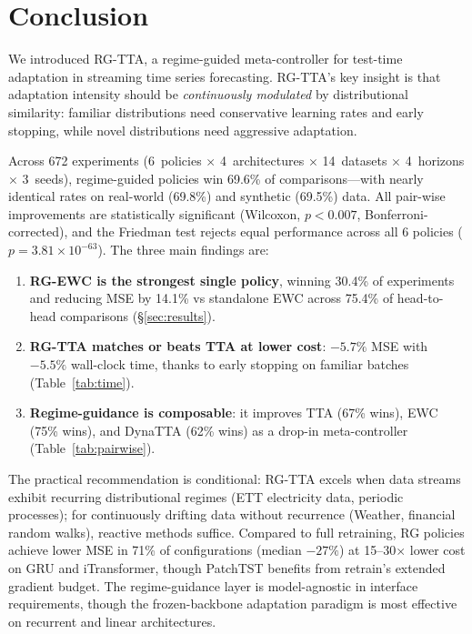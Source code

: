 \documentclass[journal]{IEEEtran}
\begin{document}
\section{Conclusion}
\label{sec:conclusion}

We introduced RG-TTA, a regime-guided meta-controller for test-time adaptation in streaming time series forecasting. RG-TTA's key insight is that adaptation intensity should be \emph{continuously modulated} by distributional similarity: familiar distributions need conservative learning rates and early stopping, while novel distributions need aggressive adaptation.

Across 672 experiments (6~policies $\times$ 4~architectures $\times$ 14~datasets $\times$ 4~horizons $\times$ 3~seeds), regime-guided policies win 69.6\% of comparisons---with nearly identical rates on real-world (69.8\%) and synthetic (69.5\%) data. All pair-wise improvements are statistically significant (Wilcoxon, $p < 0.007$, Bonferroni-corrected), and the Friedman test rejects equal performance across all 6 policies ($p = 3.81 \times 10^{-63}$). The three main findings are:

\begin{enumerate}[nosep]
  \item \textbf{RG-EWC is the strongest single policy}, winning 30.4\% of experiments and reducing MSE by 14.1\% vs standalone EWC across 75.4\% of head-to-head comparisons (\S\ref{sec:results}).
  \item \textbf{RG-TTA matches or beats TTA at lower cost}: $-5.7\%$ MSE with $-5.5\%$ wall-clock time, thanks to early stopping on familiar batches (Table~\ref{tab:time}).
  \item \textbf{Regime-guidance is composable}: it improves TTA (67\% wins), EWC (75\% wins), and DynaTTA (62\% wins) as a drop-in meta-controller (Table~\ref{tab:pairwise}).
\end{enumerate}

The practical recommendation is conditional: RG-TTA excels when data streams exhibit recurring distributional regimes (ETT electricity data, periodic processes); for continuously drifting data without recurrence (Weather, financial random walks), reactive methods suffice. Compared to full retraining, RG policies achieve lower MSE in 71\% of configurations (median $-27\%$) at 15--30$\times$ lower cost on GRU and iTransformer, though PatchTST benefits from retrain's extended gradient budget. The regime-guidance layer is model-agnostic in interface requirements, though the frozen-backbone adaptation paradigm is most effective on recurrent and linear architectures.
\end{document}
